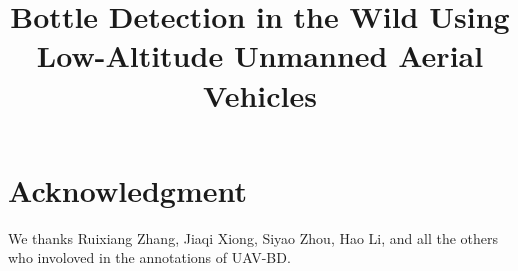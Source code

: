 \documentclass[conference]{IEEEtran}
\begin{document}
\title{Bottle Detection in the Wild Using Low-Altitude Unmanned Aerial Vehicles
}
\author{


}

\maketitle















\section*{Acknowledgment}

We thanks Ruixiang Zhang, Jiaqi Xiong, Siyao Zhou, Hao Li, and all the others who involoved in the annotations of UAV-BD.

\end{document}
